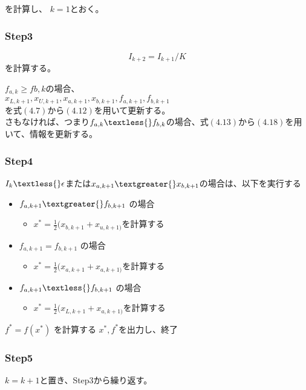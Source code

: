 を計算し、 $k = 1$とおく。

\subsubsection*{Step3}\label{step3}

$$ I_{k+2} = I_{k+1} / K $$ を計算する。

$f_{a,k} \geq f{b,k}$の場合、 \\
$x_{L,k+1}, x_{U,k+1}, x_{a,k+1}, x_{b,k+1}, f_{a,k+1},
f_{b,k+1}$ \\
を式$(4.7)$から$(4.12)$を用いて更新する。 \\
さもなければ、つまり$f_{a,k} \textless{}
f_{b,k}$の場合、式$(4.13)$から$(4.18)$を用いて、情報を更新する。

\subsubsection*{Step4}\label{step4}

$I_k \textless{} \epsilon$または$x_{a,k+1}
\textgreater{} x_{b,k+1}$の場合は、以下を実行する

\begin{itemize}
\tightlist
\item
  $f_{a,k+1} \textgreater{} f_{b,k+1}$ の場合

  \begin{itemize}
  \tightlist
  \item
    $x^\ast =
    \frac{1}{2}(x_{b,k+1} +
    x_{u,k+1)}$を計算する
  \end{itemize}
\item
  $f_{a,k+1} = f_{b,k+1}$ の場合

  \begin{itemize}
  \tightlist
  \item
    $x^\ast =
    \frac{1}{2}(x_{a,k+1} +
    x_{a,k+1)}$を計算する
  \end{itemize}
\item
  $f_{a,k+1} \textless{} f_{b,k+1}$ の場合

  \begin{itemize}
  \tightlist
  \item
    $x^\ast =
    \frac{1}{2}(x_{L,k+1} +
    x_{a,k+1)}$を計算する
  \end{itemize}
\end{itemize}

$f^\ast = f(x^\ast)$ を計算する
$x^\ast, f^\ast$を出力し、終了

\subsubsection*{Step5}\label{step5}

$k = k + 1$と置き、Step3から繰り返す。

